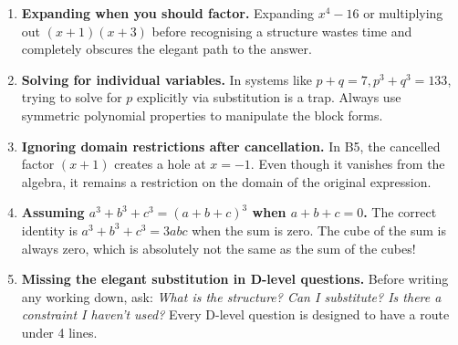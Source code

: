 \documentclass[11pt,a4paper]{article}
\begin{document}
\begin{enumerate}[leftmargin=2em, itemsep=4pt]
  \item \textbf{Expanding when you should factor.}
        Expanding $x^4-16$ or multiplying out $(x+1)(x+3)$ before recognising a structure wastes time and completely obscures the elegant path to the answer. 
  \item \textbf{Solving for individual variables.}
        In systems like $p+q=7, p^3+q^3=133$, trying to solve for $p$ explicitly via substitution is a trap. Always use symmetric polynomial properties to manipulate the block forms. 
  \item \textbf{Ignoring domain restrictions after cancellation.}
        In B5, the cancelled factor $(x+1)$ creates a hole at $x=-1$. Even though it vanishes from the algebra, it remains a restriction on the domain of the original expression. 
  \item \textbf{Assuming $a^3+b^3+c^3 = (a+b+c)^3$ when $a+b+c=0$.}
        The correct identity is $a^3+b^3+c^3=3abc$ when the sum is zero. The cube of the sum is always zero, which is absolutely not the same as the sum of the cubes! 
  \item \textbf{Missing the elegant substitution in D-level questions.}
        Before writing any working down, ask: \emph{What is the structure? Can I substitute? Is there a constraint I haven't used?} Every D-level question is designed to have a route under 4 lines. 
\end{enumerate}

\end{document}
